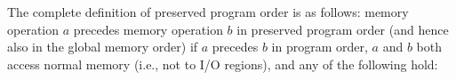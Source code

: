 \newcommand{\ppoldstld}{$a$ and $b$ are loads, and there exists some store $m$ between $a$ and $b$ in program order such that $m$ has an address or data dependency on $a$, and $b$ reads a value written by $m$}
\newcommand{\ppoaddrpo}{$a$ is a load, $b$ is a store, and there exists some instruction $m$ between $a$ and $b$ in program order such that $m$ has an address dependency on $a$}

The complete definition of preserved program order is as follows:
memory operation $a$ precedes memory operation $b$ in preserved program order (and hence also in the global memory order) if $a$ precedes $b$ in program order, $a$ and $b$ both access normal memory (i.e., not to I/O regions), and any of the following hold:

